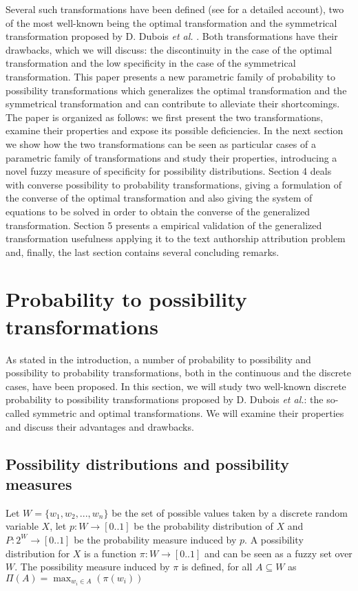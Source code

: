 \documentclass[a4paper]{article}
\begin{document}
Several such transformations have been defined (see \cite{Ous00} for a detailed account), two of the most well-known being the optimal transformation and the symmetrical transformation proposed by D. Dubois \textit{et al.} \cite{Dubois82,Dubois1993}. Both transformations have their drawbacks, which we will discuss: the discontinuity in the case of the optimal transformation and the low specificity in the case of the symmetrical transformation. This paper presents a new parametric family of probability to possibility transformations which generalizes the optimal transformation and the symmetrical transformation and can contribute to alleviate their shortcomings. The paper is organized as follows: we first present the two transformations, examine their properties and expose its possible deficiencies. In the next section we show how the two transformations can be seen as particular cases of a parametric family of transformations and study their properties, introducing a novel fuzzy measure of specificity for possibility distributions. Section 4 deals with converse possibility to probability transformations, giving a formulation of the converse of the optimal transformation and also giving the system of equations to be solved in order to obtain the converse of the generalized transformation. Section 5 presents a empirical validation of the generalized transformation usefulness applying it to the text authorship attribution problem and, finally, the last section
contains several concluding remarks.

\section{Probability to possibility transformations}

As stated in the introduction, a number of probability to possibility and possibility to probability transformations, both in the continuous and the discrete cases, have been proposed. In this section, we will study two well-known discrete probability to possibility transformations proposed by D. Dubois \emph{et al.}: the so-called symmetric \cite{Dubois82} and optimal \cite{Dubois1993} transformations. We will examine their properties and discuss their advantages and drawbacks.

\subsection{Possibility distributions and possibility measures}Let $W=\{w_1,w_2,...,w_n\}$ be the set of possible values taken by a discrete random variable $X$, let $p:W \rightarrow [0..1]$ be the probability distribution of $X$ and $P:2^W \rightarrow [0..1]$ be the probability measure induced by $p$. A possibility distribution for $X$ is a function $\pi:W \rightarrow [0..1]$ and can be seen as a fuzzy set over $W$. The possibility measure induced by $\pi$ is defined, for all $A \subseteq W$ as $\Pi(A)=\max_{w_i \in A}(\pi(w_i))$
\end{document}

